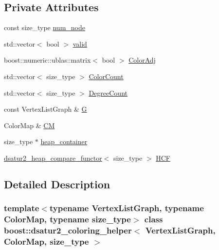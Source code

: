 \subsection*{Private Attributes}
\begin{DoxyCompactItemize}
\item 
const size\+\_\+type \hyperlink{classboost_1_1dsatur2__coloring__helper_ae4a14a29af7836813076c4cc1397bfa1}{num\+\_\+node}
\item 
std\+::vector$<$ bool $>$ \hyperlink{classboost_1_1dsatur2__coloring__helper_a65bbfc332c48577d488287470e82a78e}{valid}
\item 
boost\+::numeric\+::ublas\+::matrix$<$ bool $>$ \hyperlink{classboost_1_1dsatur2__coloring__helper_a191c842010e866aba65b3b025455170f}{Color\+Adj}
\item 
std\+::vector$<$ size\+\_\+type $>$ \hyperlink{classboost_1_1dsatur2__coloring__helper_ad40e17e570c52272d09b5da508c6cde9}{Color\+Count}
\item 
std\+::vector$<$ size\+\_\+type $>$ \hyperlink{classboost_1_1dsatur2__coloring__helper_a10bf0ba743316d8f2d9750d95080c3f0}{Degree\+Count}
\item 
const Vertex\+List\+Graph \& \hyperlink{classboost_1_1dsatur2__coloring__helper_a004746f35584b70c30cb48c2460dcc33}{G}
\item 
Color\+Map \& \hyperlink{classboost_1_1dsatur2__coloring__helper_ab4e5cdc45d0e2579f3a43ed1464e6983}{CM}
\item 
size\+\_\+type $\ast$ \hyperlink{classboost_1_1dsatur2__coloring__helper_abee38e86ad7697afd89e0f6b6c684d6e}{heap\+\_\+container}
\item 
\hyperlink{structboost_1_1dsatur2__heap__compare__functor}{dsatur2\+\_\+heap\+\_\+compare\+\_\+functor}$<$ size\+\_\+type $>$ \hyperlink{classboost_1_1dsatur2__coloring__helper_a1a8dcdf6568541a1d37ebc3f19ac0f0e}{H\+CF}
\end{DoxyCompactItemize}


\subsection{Detailed Description}
\subsubsection*{template$<$typename Vertex\+List\+Graph, typename Color\+Map, typename size\+\_\+type$>$\newline
class boost\+::dsatur2\+\_\+coloring\+\_\+helper$<$ Vertex\+List\+Graph, Color\+Map, size\+\_\+type $>$}

